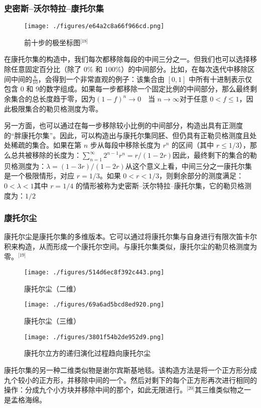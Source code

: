 \subsubsection{史密斯–沃尔特拉–康托尔集}
\begin{figure}[ht]
\centering
\texttt{[image: ./figures/e64a2c8a66f966cd.png]}
\caption{前十步的极坐标图\(^\text{[18]}\)} \label{fig_KTRJ_3}
\end{figure}
在康托尔集的构造中，我们每次都移除每段的中间三分之一。但我们也可以选择移除任意固定百分比（除了 0\% 和 100\%）的中间部分。比如，在每次迭代中移除区间中间的$\frac{8}{10}$，会得到一个非常直观的例子：该集合由 $[0, 1]$ 中所有十进制表示仅包含 0 和 9的数字组成。如果每一步都移除一个固定比例的中间部分，那么最终剩余集合的总长度趋于零，因为$(1 - f)^n \to 0 \quad \text{当 } n \to \infty$对于任意 $0 < f \leq 1$，因此极限集合的勒贝格测度为零。

另一方面，也可以通过在每一步移除较小比例的中间部分，构造出具有正测度的“胖康托尔集”。因此，可以构造出与康托尔集同胚、但仍具有正勒贝格测度且处处稀疏的集合。如果在第 $n$ 步从每段中移除长度为 $r^n$ 的区间（其中 $r \leq 1/3$），那么总共被移除的长度为：$\sum_{n=1}^{\infty} 2^{n-1} r^n = r/(1 - 2r)$因此，最终剩下的集合的勒贝格测度为：$\lambda =(1 - 3r)/(1 - 2r)$从这个意义上看，中间三分之一康托尔集是一个极限情形，对应 $r = 1/3$。如果 $0 < r < 1/3$，则剩余部分的测度满足：$0 < \lambda < 1$其中 $r = 1/4$ 的情形被称为史密斯–沃尔特拉–康托尔集，它的勒贝格测度为：$1/2$
\subsubsection{康托尔尘}
康托尔尘是康托尔集的多维版本。它可以通过将康托尔集与自身进行有限次笛卡尔积来构造，从而形成一个康托尔空间。与康托尔集类似，康托尔尘的勒贝格测度为零。\(^\text{[19]}\)
\begin{figure}[ht]
\centering
\texttt{[image: ./figures/514d6ec8f392c443.png]}
\caption{康托尔尘（二维）} \label{fig_KTRJ_4}
\end{figure}
\begin{figure}[ht]
\centering
\texttt{[image: ./figures/69a6ad5bcd8ed920.png]}
\caption{康托尔尘（三维）} \label{fig_KTRJ_5}
\end{figure}
\begin{figure}[ht]
\centering
\texttt{[image: ./figures/3801f54b2de952d9.png]}
\caption{康托尔立方的递归演化过程趋向康托尔尘} \label{fig_KTRJ_6}
\end{figure}
康托尔集的另一种二维类似物是谢尔宾斯基地毯。该构造方法是将一个正方形分成九个较小的正方形，并移除中间的一个。然后对剩下的每个正方形再次进行相同的操作：分成九个小方块并移除中间的那个，如此无限进行。\(^\text{[20]}\)其三维类似物之一是孟格海绵。
